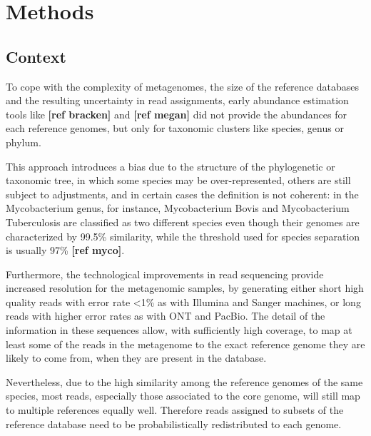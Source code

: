 
\chapter{Methods}
\label{Chapter3}

\section{Context}

To cope with the complexity of metagenomes, the size of the reference databases and the resulting uncertainty in read assignments, early abundance estimation tools like \textbf{[ref bracken]} and \textbf{[ref megan]} did not provide the abundances for each reference genomes, but only for taxonomic clusters like species, genus or phylum.

This approach introduces a bias due to the structure of the phylogenetic or taxonomic tree, in which some species may be over-represented, others are still subject to adjustments, and in certain cases the definition is not coherent: in the Mycobacterium genus, for instance, Mycobacterium Bovis and Mycobacterium Tuberculosis are classified as two different species even though their genomes are characterized by 99.5\% similarity, while the threshold used for species separation is usually 97\% \textbf{[ref myco]}.

Furthermore, the technological improvements in read sequencing provide increased resolution for the metagenomic samples, by generating either short high quality reads with error rate <1\% as with Illumina and Sanger machines, or long reads with higher error rates as with ONT and PacBio. The detail of the information in these sequences allow, with sufficiently high coverage, to map at least some of the reads in the metagenome to the exact reference genome they are likely to come from, when they are present in the database.

Nevertheless, due to the high similarity among the reference genomes of the same species, most reads, especially those associated to the core genome, will still map to multiple references equally well. Therefore reads assigned to subsets of the reference database need to be probabilistically redistributed to each genome.

